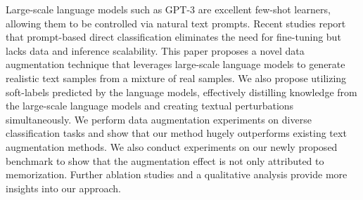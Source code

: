Large-scale language models such as GPT-3 are excellent few-shot learners, allowing them to be controlled via natural text prompts. Recent studies report that prompt-based direct classification eliminates the need for fine-tuning but lacks data and inference scalability. This paper proposes a novel data augmentation technique that leverages large-scale language models to generate realistic text samples from a mixture of real samples. We also propose utilizing soft-labels predicted by the language models, effectively distilling knowledge from the large-scale language models and creating textual perturbations simultaneously. We perform data augmentation experiments on diverse classification tasks and show that our method hugely outperforms existing text augmentation methods. We also conduct experiments on our newly proposed benchmark to show that the augmentation effect is not only attributed to memorization. Further ablation studies and a qualitative analysis provide more insights into our approach.
